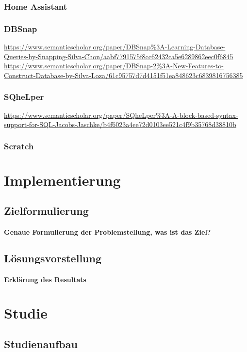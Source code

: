 \documentclass[a4paper, 12pt, oneside, BCOR=1cm,toc=chapterentrywithdots]{scrbook}
\begin{document}
\subsection{Home Assistant}
\subsection{DBSnap}
\url{https://www.semanticscholar.org/paper/DBSnap\%3A-Learning-Database-Queries-by-Snapping-Silva-Chon/aabf7791575f8cc62432ca5e6289862eec0f6845}
\url{https://www.semanticscholar.org/paper/DBSnap-2\%3A-New-Features-to-Construct-Database-by-Silva-Loza/61c95757d7d4151f51ea848623c6839816756385}
\subsection{SQheLper}
\url{https://www.semanticscholar.org/paper/SQheLper\%3A-A-block-based-syntax-support-for-SQL-Jacobs-Jaschke/b4f6023a4ee72d0103ee521c4f9b35768d38810b}
\subsection{Scratch}


\chapter{Implementierung}
\section{Zielformulierung}
\subsubsection{Genaue Formulierung der Problemstellung, was ist das Ziel?}
\section{Lösungsvorstellung}
\subsubsection{Erklärung des Resultats}

\chapter{Studie}
\section{Studienaufbau}
\end{document}
